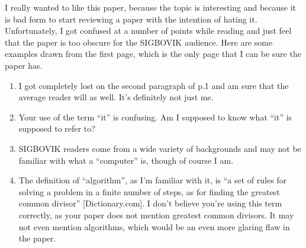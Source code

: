 \documentclass[12pt]{sigbovik-review}
\author{Definitely an expert and not a first-year grad student subreviewing}
\begin{document}
\maketitle

I really wanted to like this paper, because the topic is interesting and
because it is bad form to start reviewing a paper with the intention of
hating it. Unfortunately, I got confused at a number of points while
reading and just feel that the paper is too obscure for the SIGBOVIK
audience. Here are some examples drawn from the first page, which is
the only page that I can be sure the paper has.

\begin{enumerate}
\item I got completely lost on the second paragraph of p.1 and am sure that
the average reader will as well. It's definitely not just me.
\item Your use of the term ``it'' is confusing. Am I supposed to know what
``it'' is supposed to refer to?
\item SIGBOVIK readers come from a wide variety of backgrounds and may not
be familiar with what a ``computer'' is, though of course I am.
\item The definition of ``algorithm'', as I'm familiar with it, is
``a set of rules for solving a problem in a finite number of steps,
as for finding the greatest common divisor'' [Dictionary.com].
I don't believe you're using this term correctly, as your paper does not
mention greatest common divisors. It may not even mention algorithms, which
would be an even more glaring flaw in the paper.
\end{enumerate}
\end{document}
